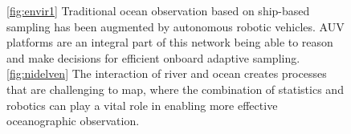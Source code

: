 \documentclass[aoas]{imsart}
\begin{document}
\begin{figure}[!h] 
  \centering 
  \hfill
  \caption{\ref{fig:envir1} Traditional ocean observation based on 
    ship-based sampling has been augmented by autonomous
    robotic vehicles. %
    AUV platforms are an integral part of this network being able to
    reason and make decisions for efficient onboard adaptive sampling.
    \ref{fig:nidelven} The interaction of river and ocean creates
    processes that are challenging to map, where the combination of
    statistics and robotics can play a vital role in enabling more
    effective oceanographic observation.}
  \label{fig:envir} \end{figure}
\end{document}

